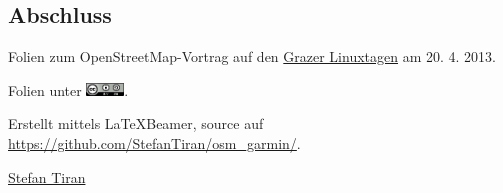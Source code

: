 \documentclass{beamer}
\begin{document}
\subsection{Abschluss}
\begin{frame}

Folien zum OpenStreetMap-Vortrag auf den
\href{http://http://linuxtage.at/}{Grazer Linuxtagen} am 20. 4. 2013.
\vspace{1cm}

Folien unter \includegraphics[width=1cm]{cc-by-sa.png}.
\vspace{1cm}

Erstellt mittels \LaTeX Beamer, source auf \url{https://github.com/StefanTiran/osm_garmin/}.
\vspace{1cm}

\href{mailto:stefan.tiran@student.TUGraz.at}{Stefan Tiran}
\end{frame}
\end{document}
